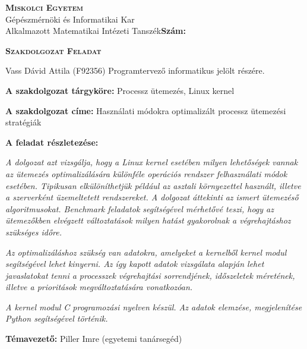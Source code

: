 \begin{flushleft}
\textsc{\bfseries Miskolci Egyetem}\\
Gépészmérnöki és Informatikai Kar\\
Alkalmazott Matematikai Intézeti Tanszék\hspace*{4cm}\hfil \textbf{Szám:}
\end{flushleft}
\vskip 0.5cm
\begin{center}
\large\textsc{\bfseries Szakdolgozat Feladat}
\end{center}
\vskip 0.5cm
Vass Dávid Attila (F92356) Programtervező informatikus jelölt részére.\newline

\noindent\textbf{A szakdolgozat tárgyköre:} Processz ütemezés, Linux kernel\newline

\noindent\textbf{A szakdolgozat címe:}
Használati módokra optimalizált processz ütemezési stratégiák\newline

\noindent\textbf{A feladat részletezése:}

\medskip

\emph{A dolgozat azt vizsgálja, hogy a Linux kernel esetében milyen lehetőségek vannak az ütemezés optimalizálására különféle operációs rendszer felhasználati módok esetében. Tipikusan elkülöníthetjük például az asztali környezettel használt, illetve a szerverként üzemeltetett rendszereket. A dolgozat áttekinti az ismert ütemezéső algoritmusokat. Benchmark feladatok segítségével mérhetővé teszi, hogy az ütemezőkben elvégzett változtatások milyen hatást gyakorolnak a végrehajtáshoz szükséges időre.}

\medskip

\emph{Az optimalizáláshoz szükség van adatokra, amelyeket a kernelből kernel modul segítségével lehet kinyerni. Az így kapott adatok vizsgálata alapján lehet javaslatokat tenni a processzek végrehajtási sorrendjének, időszeletek méretének, illetve a prioritások megváltoztatására vonatkozóan.}

\medskip

\emph{A kernel modul C programozási nyelven készül. Az adatok elemzése, megjelenítése Python segítségével történik.}

\vfill

\noindent\textbf{Témavezető:} Piller Imre (egyetemi tanársegéd) \newline


